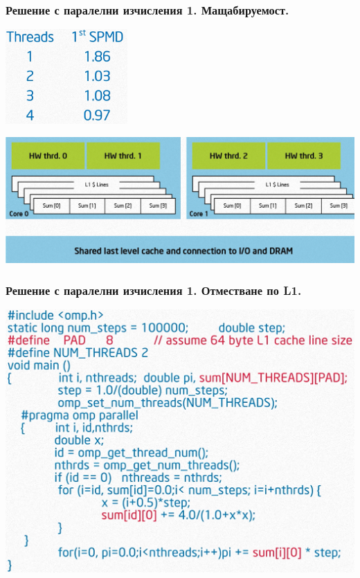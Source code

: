 \documentclass{beamer}
\begin{document}
\begin{frame}
  \frametitle{Решение с паралелни изчисления 1. Мащабируемост.}
\centering
\includegraphics[width=0.35\textwidth]{scaling}\pause

\includegraphics[width=\textwidth]{false-sharing}
\end{frame}

\begin{frame}
  \frametitle{Решение с паралелни изчисления 1. Отместване по L1.}
  \includegraphics[width=\textwidth]{cache-line-overcome.png}
\end{frame}
\end{document}
